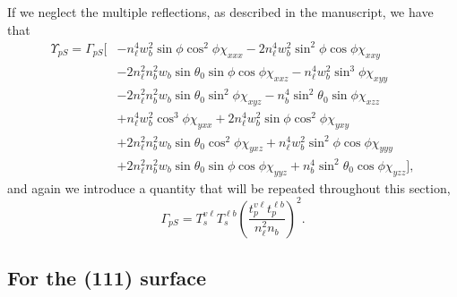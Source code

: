 If we neglect the multiple reflections, as described in the manuscript, we have
that
\begin{equation}\label{eq:rpsfull}
\begin{split}
\Upsilon_{pS}
= 
\Gamma_{pS}
\big[
&- n^{4}_{\ell}w^{2}_{b}\sin\phi\cos^{2}\phi\chi_{xxx}
 - 2n^{4}_{\ell}w^{2}_{b}\sin^{2}\phi\cos\phi\chi_{xxy}\\
&- 2n^{2}_{\ell}n^{2}_{b}w_{b}\sin\theta_{0}\sin\phi\cos\phi\chi_{xxz}
 - n^{4}_{\ell}w^{2}_{b}\sin^{3}\phi\chi_{xyy}\\
&- 2n^{2}_{\ell}n^{2}_{b}w_{b}\sin\theta_{0}\sin^{2}\phi\chi_{xyz}
 - n^{4}_{b}\sin^{2}\theta_{0}\sin\phi\chi_{xzz}\\
&+ n^{4}_{\ell}w^{2}_{b}\cos^{3}\phi\chi_{yxx}
 + 2n^{4}_{\ell}w^{2}_{b}\sin\phi\cos^{2}\phi\chi_{yxy}\\
&+ 2n^{2}_{\ell}n^{2}_{b}w_{b}\sin\theta_{0}\cos^{2}\phi\chi_{yxz}
 + n^{4}_{\ell}w^{2}_{b}\sin^{2}\phi\cos\phi\chi_{yyy}\\
&+ 2n^{2}_{\ell}n^{2}_{b}w_{b}\sin\theta_{0}\sin\phi\cos\phi\chi_{yyz}
 + n^{4}_{b}\sin^{2}\theta_{0}\cos\phi\chi_{yzz}
\big],
\end{split}
\end{equation}
and again we introduce a quantity that will be repeated throughout this section,
\begin{equation}\label{eq:gammaps}
\Gamma_{pS} =
T^{v\ell}_{s}T^{\ell b}_{s}\left(\frac{t^{v\ell}_{p}t^{\ell b}_{p}}
      {n^{2}_{\ell}n_{b}}\right)^{2}.
\end{equation}


\subsection{For the (111) surface}

